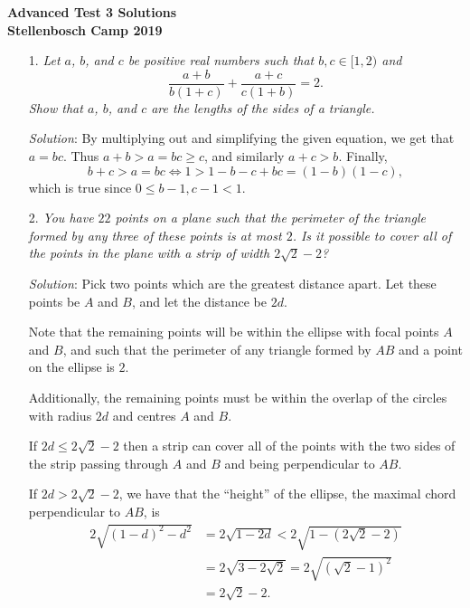 \documentclass{article}
\begin{document}
\begin{center}
  \textbf{\Large Advanced Test 3 Solutions}
  \\ \vspace{1em}
  \textbf{\large Stellenbosch Camp 2019}
\end{center}

\vspace{12pt}


\begin{enumerate}

\item[1.] %
{\itshape
Let $a$, $b$, and $c$ be positive real numbers such that $b, c \in [1,2)$ and
\[ \frac{a+b}{b(1+c)} +\frac{a+c}{c(1+b)} = 2. \]
Show that $a$, $b$, and $c$ are the lengths of the sides of a triangle. 
}

\textit{Solution}:
By multiplying out and simplifying the given equation, we get that $a = bc$.
Thus $a + b > a = bc \geq c$, and similarly $a+c > b$.
Finally,
\[ b+c > a = bc \iff 1 > 1 -b -c +bc = (1-b)(1-c), \]
which is true since $0 \leq b-1, c-1 < 1$.


\item[2.] %
{\itshape
You have $22$ points on a plane such that the perimeter of the triangle formed by any three of these points is at most $2$. Is it possible to cover all of the points in the plane with a strip of width $2\sqrt{2} - 2$?
}

\textit{Solution}:
Pick two points which are the greatest distance apart. Let these points be $A$ and $B$, and let the distance be $2d$.

Note that the remaining points will be within the ellipse with focal points $A$ and $B$, and such that the perimeter of any triangle formed by $AB$ and a point on the ellipse is $2$.

Additionally, the remaining points must be within the overlap of the circles with radius $2d$ and centres $A$ and $B$.

If $2d \leq 2\sqrt{2} - 2$ then a strip can cover all of the points with the two sides of the strip passing through $A$ and $B$ and being perpendicular to $AB$.

If $2d > 2\sqrt{2} - 2$, we have that the ``height'' of the ellipse, the maximal chord perpendicular to $AB$, is
\begin{align*}
	2 \sqrt{{(1 - d)}^2 - d^2} & = 2 \sqrt{1 - 2d} < 2 \sqrt{1 - (2\sqrt{2} - 2)} \\
	& = 2 \sqrt{3 - 2\sqrt{2}} = 2 \sqrt{{(\sqrt{2} - 1)}^2} \\
	& = 2 \sqrt{2} - 2.
\end{align*}


\end{enumerate}
\end{document}
